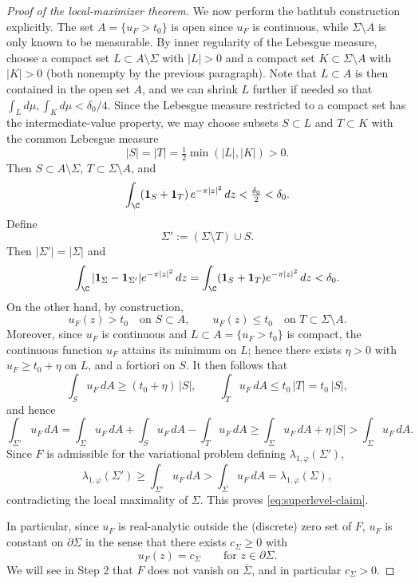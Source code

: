 \begin{proof}[Proof of the local-maximizer theorem]
We now perform the bathtub construction explicitly. The set
\(A=\{u_F>t_0\}\) is open since \(u_F\) is continuous, while
\(\Sigma\setminus A\) is only known to be measurable. By inner regularity of
the Lebesgue measure, choose a compact set \(L\subset A\setminus\Sigma\) with
\(|L|>0\) and a compact set \(K\subset \Sigma\setminus A\) with \(|K|>0\)
(both nonempty by the previous paragraph). Note that \(L\subset A\) is then
contained in the open set \(A\), and we can shrink \(L\) further if needed so
that \(\int_L d\mu, \int_K d\mu<\delta_0/4\). Since the Lebesgue measure
restricted to a compact set has the intermediate-value property, we may
choose subsets \(S\subset L\) and \(T\subset K\) with the common Lebesgue
measure
\[
|S|=|T|=\tfrac12\min(|L|,|K|)>0.
\]
Then \(S\subset A\setminus\Sigma\), \(T\subset \Sigma\setminus A\), and
\[
\int_\C (\mathbf 1_S+\mathbf 1_T)\,e^{-\pi |z|^2}\,dz<\tfrac{\delta_0}{2}<\delta_0.
\]
Define
\[
\Sigma':=(\Sigma\setminus T)\cup S.
\]
Then \(|\Sigma'|=|\Sigma|\) and
\[
\int_\C |\mathbf 1_\Sigma-\mathbf 1_{\Sigma'}|e^{-\pi |z|^2}\,dz
=\int_\C(\mathbf 1_S+\mathbf 1_T)e^{-\pi|z|^2}\,dz<\delta_0.
\]
On the other hand, by construction,
\[
u_F(z)>t_0 \quad \text{on } S\subset A,
\qquad
u_F(z)\le t_0 \quad \text{on } T\subset \Sigma\setminus A.
\]
Moreover, since \(u_F\) is continuous and \(L\subset A=\{u_F>t_0\}\) is
compact, the continuous function \(u_F\) attains its minimum on \(L\); hence
there exists \(\eta>0\) with \(u_F\ge t_0+\eta\) on \(L\), and a fortiori on
\(S\). It then follows that
\[
\int_S u_F\,dA \ge (t_0+\eta)\,|S|,
\qquad
\int_T u_F\,dA \le t_0\,|T|=t_0\,|S|,
\]
and hence
\[
\int_{\Sigma'} u_F\,dA
=
\int_\Sigma u_F\,dA + \int_S u_F\,dA-\int_T u_F\,dA
\ge \int_\Sigma u_F\,dA + \eta\,|S|
>
\int_\Sigma u_F\,dA.
\]
Since \(F\) is admissible for the variational problem defining
\(\lambda_{1,\varphi}(\Sigma')\),
\[
\lambda_{1,\varphi}(\Sigma')
\ge \int_{\Sigma'} u_F\,dA
>
\int_\Sigma u_F\,dA
=
\lambda_{1,\varphi}(\Sigma),
\]
contradicting the local maximality of \(\Sigma\). This proves
\eqref{eq:superlevel-claim}.

In particular, since \(u_F\) is real-analytic outside the (discrete) zero set of
\(F\), \(u_F\) is constant on \(\partial \Sigma\) in the sense that there exists
\(c_\Sigma\ge 0\) with
\begin{equation}\label{eq:boundary-level-set-new}
u_F(z)=c_\Sigma
\qquad \text{for } z\in \partial \Sigma.
\end{equation}
We will see in Step 2 that \(F\) does not vanish on \(\overline\Sigma\), and in
particular \(c_\Sigma>0\).


\end{proof}
